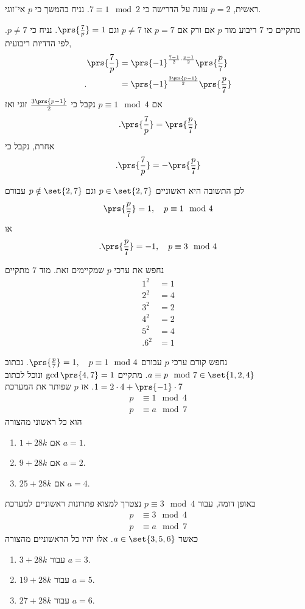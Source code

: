 \documentclass[a4paper,10pt,twoside,openany]{book}
\begin{document}
\begin{solution}
ראשית, $p = 2$
עונה על הדרישה כי
$7 \equiv 1 \mod{2}$.
נניח בהמשך כי
$p$
אי־זוגי.

מתקיים כי
$7$
ריבוע מוד
$p$
אם ורק אם
$p = 7$
או
$p \neq 7$
וגם
$\prs{\frac{7}{p}} = 1$.
נניח כי
$p \neq 7$.
לפי הדדיות ריבועית,
\begin{align*}
\prs{\frac{7}{p}} &= \prs{-1}^{\frac{7-1}{2} \cdot \frac{p-1}{2}} \prs{\frac{p}{7}}
\\
\text{.} \hphantom{\prs{\frac{7}{p}}}
&=
\prs{-1}^{\frac{3 \prs{p-1}}{2}} \prs{\frac{p}{7}}
\end{align*}
אם
$p \equiv 1 \mod{4}$
נקבל כי
$\frac{3 \prs{p-1}}{2}$
זוגי ואז
\begin{align*}
\text{.} \prs{\frac{7}{p}} = \prs{\frac{p}{7}}
\end{align*}
אחרת, נקבל כי
\[\text{.} \prs{\frac{7}{p}} = - \prs{\frac{p}{7}}\]

לכן התשובה היא ראשוניים
$p \in \set{2,7}$
וגם
$p \notin \set{2,7}$
עבורם
\[\prs{\frac{p}{7}} = 1, \quad p \equiv 1 \mod{4}\]
או
\[\text{.}\prs{\frac{p}{7}} = -1, \quad p \equiv 3 \mod{4}\]

נחפש את ערכי
$p$
שמקיימים זאת.
מוד
$7$
מתקיים
\begin{align*}
1^2 &= 1 \\
2^2 &= 4 \\
3^2 &= 2 \\
4^2 &= 2 \\
5^2 &= 4 \\
\text{.} 6^2 &= 1
\end{align*}

נחפש קודם ערכי
$p$
עבורם
$\prs{\frac{p}{7}} = 1, \quad p \equiv 1 \mod{4}$.
נכתוב
$a \equiv p \mod{7} \in \set{1,2,4}$.
מתקיים
$\gcd\prs{4,7} = 1$
ונוכל לכתוב
$1 = 2 \cdot 4 + \prs{-1} \cdot 7$.
אז
$p$
שפותר את המערכת
\begin{align*}
p &\equiv 1 \mod{4} \\
p &\equiv a \mod{7}
\end{align*}
הוא כל ראשוני מהצורה
\begin{enumerate}
\item $1 + 28k$
אם
$a = 1$.
\item $9 + 28k$
אם
$a = 2$.
\item $25 + 28k$
אם
$a = 4$.
\end{enumerate}

באופן דומה, עבור
$p \equiv 3 \mod{4}$
נצטרך למצוא פתרונות ראשוניים למערכת
\begin{align*}
p &\equiv 3 \mod{4} \\
p &\equiv a \mod{7}
\end{align*}
כאשר
$a \in \set{3,5,6}$.
אלו יהיו כל הראשוניים מהצורה
\begin{enumerate}
\item $3 + 28k$
עבור
$a = 3$.
\item $19 + 28k$
עבור
$a = 5$.
\item $27 + 28k$
עבור
$a = 6$.
\end{enumerate}
\end{solution}
\end{document}
